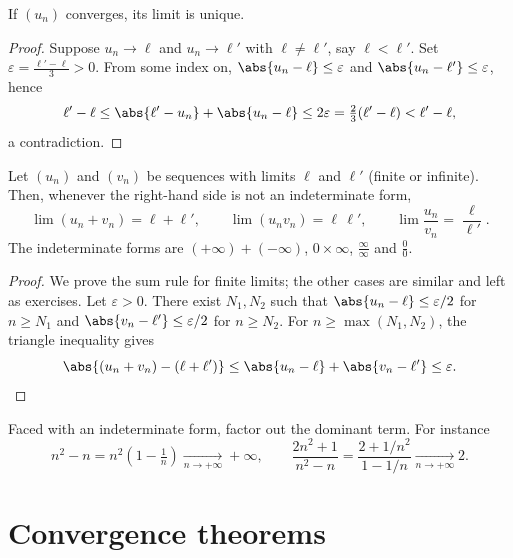 \begin{proposition}\label{prop:tle:seq:uniqueness}
If $(u_n)$ converges, its limit is unique.
\end{proposition}

\begin{proof}
Suppose $u_n \to \ell$ and $u_n \to \ell'$ with $\ell \neq \ell'$, say
$\ell < \ell'$. Set $\varepsilon = \frac{\ell' - \ell}{3} > 0$. From some
index on, $\abs{u_n - \ell} \leq \varepsilon$ and
$\abs{u_n - \ell'} \leq \varepsilon$, hence
\[
\ell' - \ell \leq \abs{\ell' - u_n} + \abs{u_n - \ell}
\leq 2\varepsilon = \tfrac{2}{3}(\ell' - \ell) < \ell' - \ell,
\]
a contradiction.
\end{proof}

\begin{proposition}\label{prop:tle:seq:operations}
Let $(u_n)$ and $(v_n)$ be sequences with limits $\ell$ and $\ell'$ (finite or
infinite). Then, whenever the right-hand side is not an indeterminate form,
\[
\lim (u_n + v_n) = \ell + \ell', \qquad
\lim (u_n v_n) = \ell\,\ell', \qquad
\lim \frac{u_n}{v_n} = \frac{\ell}{\ell'}.
\]
The indeterminate forms are
$(+\infty) + (-\infty)$, $0 \times \infty$, $\frac{\infty}{\infty}$ and
$\frac{0}{0}$.
\end{proposition}

\begin{proof}
We prove the sum rule for finite limits; the other cases are similar and left
as exercises. Let $\varepsilon > 0$. There exist $N_1, N_2$ such that
$\abs{u_n - \ell} \leq \varepsilon/2$ for $n \geq N_1$ and
$\abs{v_n - \ell'} \leq \varepsilon/2$ for $n \geq N_2$. For
$n \geq \max(N_1, N_2)$, the triangle inequality gives
\[
\abs{(u_n + v_n) - (\ell + \ell')}
\leq \abs{u_n - \ell} + \abs{v_n - \ell'} \leq \varepsilon. \qedhere
\]
\end{proof}

\begin{method}\label{met:tle:seq:indeterminate}
Faced with an indeterminate form, factor out the dominant term. For instance
\[
n^2 - n = n^2\left(1 - \tfrac{1}{n}\right) \xrightarrow[n\to+\infty]{} +\infty,
\qquad
\frac{2n^2+1}{n^2 - n} = \frac{2 + 1/n^2}{1 - 1/n}
\xrightarrow[n\to+\infty]{} 2 .
\]
\end{method}

\section{Convergence theorems}

